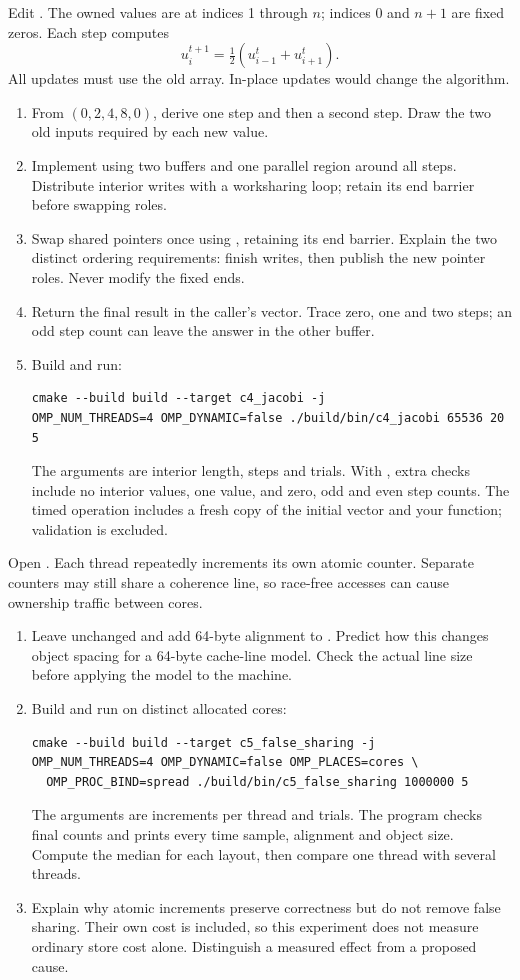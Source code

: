 Edit . The owned values are at indices 1 through $n$;
indices 0 and $n+1$ are fixed zeros. Each step computes
\[u_i^{t+1}=\tfrac12(u_{i-1}^{t}+u_{i+1}^{t}).\]
All updates must use the old array. In-place updates would change the algorithm.
\begin{enumerate}
\item From $(0,2,4,8,0)$, derive one step and then a second step.
Draw the two old inputs required by each new value.
\item Implement  using two buffers and one parallel region around
all steps. Distribute interior writes with a worksharing loop; retain its end
barrier before swapping roles.
\item Swap shared pointers once using , retaining its end barrier.
Explain the two distinct ordering requirements: finish writes, then publish the
new pointer roles. Never modify the fixed ends.
\item Return the final result in the caller's vector. Trace zero, one and two
steps; an odd step count can leave the answer in the other buffer.
\item Build and run:
\begin{lstlisting}[style=shell]
cmake --build build --target c4_jacobi -j
OMP_NUM_THREADS=4 OMP_DYNAMIC=false ./build/bin/c4_jacobi 65536 20 5
\end{lstlisting}
The arguments are interior length, steps and trials. With , extra checks include no interior
values, one value, and zero, odd and even step counts. The timed operation includes
a fresh copy of the initial vector and your function; validation is excluded.
\end{enumerate}

Open . Each thread repeatedly increments its own
atomic counter. Separate counters may still share a coherence line, so race-free
accesses can cause ownership traffic between cores.
\begin{enumerate}
\item Leave  unchanged and add 64-byte alignment to
. Predict how this changes object spacing for a 64-byte cache-line
model. Check the actual line size before applying the model to the machine.
\item Build and run on distinct allocated cores:
\begin{lstlisting}[style=shell]
cmake --build build --target c5_false_sharing -j
OMP_NUM_THREADS=4 OMP_DYNAMIC=false OMP_PLACES=cores \
  OMP_PROC_BIND=spread ./build/bin/c5_false_sharing 1000000 5
\end{lstlisting}
The arguments are increments per thread and trials. The program checks final
counts and prints every time sample, alignment and object size. Compute the
median for each layout, then compare one thread with several threads.
\item Explain why atomic increments preserve correctness but do not remove
false sharing. Their own cost is included, so this experiment does not measure
ordinary store cost alone. Distinguish a measured effect from a proposed cause.
\end{enumerate}
